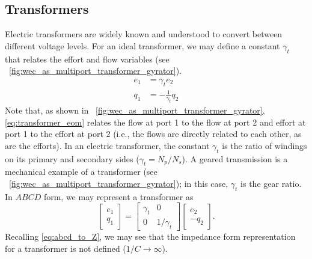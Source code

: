 \documentclass[twocolumn]{autart}
\begin{document}
\subsection{Transformers}\label{sec:trasnformers}
Electric transformers are widely known and understood to convert between different voltage levels.
For an ideal transformer, we may define a constant $\gamma_{t}$ that relates the effort and flow variables (see \figurename~\ref{fig:wec_as_multiport_transformer_gyrator}).
%
\begin{subequations}
        \begin{align}
               e_1 &= \gamma_{t} e_2 \\
               q_1 &= -\frac{1}{\gamma_t} q_2
        \end{align}
        \label{eq:transformer_eom}%
\end{subequations}
%
Note that, as shown in \figurename~\ref{fig:wec_as_multiport_transformer_gyrator}, \eqref{eq:transformer_eom} relates the flow at port 1 to the flow at port 2 and effort at port 1 to the effort at port 2 (i.e., the flows are directly related to each other, as are the efforts).
In an electric transformer, the constant $\gamma_t$ is the ratio of windings on its primary and secondary sides ($\gamma_t=N_p/N_s$).
A geared transmission is a mechanical example of a transformer (see \figurename~\ref{fig:wec_as_multiport_transformer_gyrator}); in this case, $\gamma_{t}$ is the gear ratio.
In $ABCD$ form, we may represent a transformer as
%
\begin{equation}
        \begin{bmatrix}
                e_1 \\ q_1
        \end{bmatrix}
        =
        \begin{bmatrix}
                \gamma_{t} & 0 \\ 0 & 1/\gamma_{t}
        \end{bmatrix}
        \begin{bmatrix}
                e_2 \\ - q_2
        \end{bmatrix} .
        \label{eq:transformer_abcd}
\end{equation}
%
Recalling \eqref{eq:abcd_to_Z}, we may see that the impedance form representation for a transformer is not defined ($1/C \rightarrow \infty$).

\end{document}
